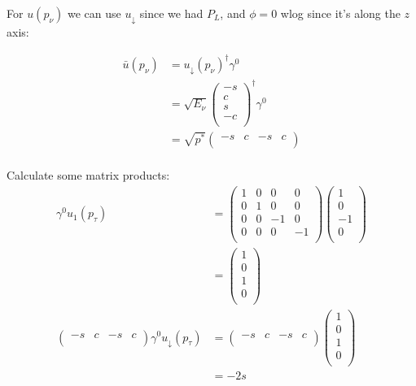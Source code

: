 For $u(p_\nu)$ we can use $u_\downarrow$ since we had $P_L$, and $\phi=0$ wlog since it's along the $z$ axis:

\begin{align*}
    \bar{u}(p_\nu) &= u_\downarrow(p_\nu)^\dagger \gamma^0\\
    &= \sqrt{E_\nu} \begin{pmatrix}
        -s \\
        c \\
        s \\
        -c \\
    \end{pmatrix}^\dagger \gamma^0\\
    &= \sqrt{p^*} \begin{pmatrix}
        -s &
        c &
        -s &
        c \\
    \end{pmatrix}\\
\end{align*}

Calculate some matrix products:
\begin{align*}
    \gamma^0u_1(p_\tau) &= \begin{pmatrix}
        1 & 0 & 0 & 0 \\
        0 & 1 & 0 & 0 \\
        0 & 0 & -1 & 0 \\
        0 & 0 & 0 & -1 \\
    \end{pmatrix}\begin{pmatrix}
        1 \\ 0 \\ -1 \\ 0 \\
    \end{pmatrix}\\
    &= \begin{pmatrix}
        1 \\
        0 \\
        1 \\
        0 \\
    \end{pmatrix}\\
    \begin{pmatrix}
        -s & c & -s & c \\
    \end{pmatrix} \gamma^0 u_\downarrow(p_\tau) &= \begin{pmatrix}
        -s & c & -s & c \\
    \end{pmatrix}\begin{pmatrix}
        1 \\
        0 \\
        1 \\
        0 \\
    \end{pmatrix}\\
    &= -2s\\
\end{align*}

